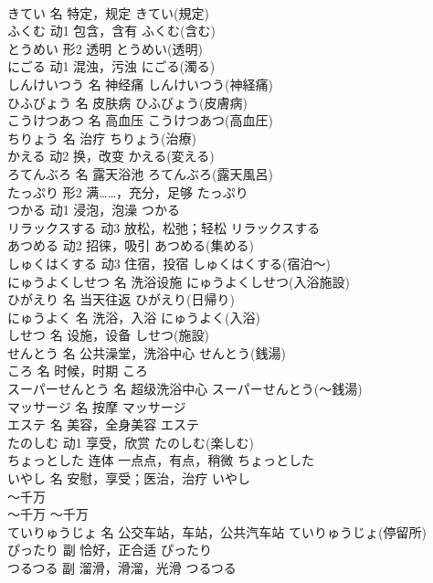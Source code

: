 \documentclass[8pt]{extreport}
\begin{document}
\begin{CJK}{UTF8}{min}
\\	きてい	名	特定，规定	きてい(規定)	
\\	ふくむ	动1	包含，含有	ふくむ(含む)	
\\	とうめい	形2	透明	とうめい(透明)	
\\	にごる	动1	混浊，污浊	にごる(濁る)	
\\	しんけいつう	名	神经痛	しんけいつう(神経痛)	
\\	ひふびょう	名	皮肤病	ひふびょう(皮膚病)	
\\	こうけつあつ	名	高血压	こうけつあつ(高血圧)	
\\	ちりょう	名	治疗	ちりょう(治療)	
\\	かえる	动2	换，改变	かえる(変える)	
\\	ろてんぶろ	名	露天浴池	ろてんぶろ(露天風呂)	
\\	たっぷり	形2	满……，充分，足够	たっぷり	
\\	つかる	动1	浸泡，泡澡	つかる	
\\	リラックスする	动3	放松，松弛；轻松	リラックスする	
\\	あつめる	动2	招徕，吸引	あつめる(集める)	
\\	しゅくはくする	动3	住宿，投宿	しゅくはくする(宿泊～)	
\\	にゅうよくしせつ	名	洗浴设施	にゅうよくしせつ(入浴施設)	
\\	ひがえり	名	当天往返	ひがえり(日帰り)	
\\	にゅうよく	名	洗浴，入浴	にゅうよく(入浴)	
\\	しせつ	名	设施，设备	しせつ(施設)	
\\	せんとう	名	公共澡堂，洗浴中心	せんとう(銭湯)	
\\	ころ	名	时候，时期	ころ	
\\	スーパーせんとう	名	超级洗浴中心	スーパーせんとう(～銭湯)	
\\	マッサージ	名	按摩	マッサージ	
\\	エステ	名	美容，全身美容	エステ	
\\	たのしむ	动1	享受，欣赏	たのしむ(楽しむ)	
\\	ちょっとした	连体	一点点，有点，稍微	ちょっとした	
\\	いやし	名	安慰，享受；医治，治疗	いやし	
\\	～千万	
\\	～千万	～千万	
\\	ていりゅうじょ	名	公交车站，车站，公共汽车站	ていりゅうじょ(停留所)	
\\	ぴったり	副	恰好，正合适	ぴったり	
\\	つるつる	副	溜滑，滑溜，光滑	つるつる	

\end{CJK}
\end{document}
